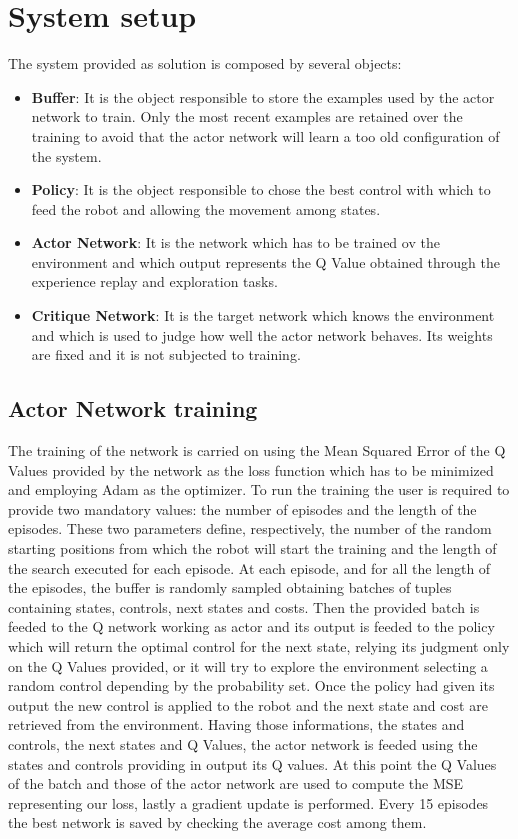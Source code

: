 \documentclass[twocolumn, a4paper]{article}
\begin{document}
\section{System setup}
The system provided as solution is composed by several objects:
\begin{itemize}
	\item \textbf{Buffer}: It is the object responsible to store the examples
		used by the actor network to train. Only the most recent examples are
		retained over the training to avoid that the actor network will learn
		a too old configuration of the system.
	\item \textbf{Policy}: It is the object responsible to chose the best
		control with which to feed the robot and allowing the movement among
		states.
	\item \textbf{Actor Network}: It is the network which has to be trained
		ov the environment and which output represents the Q Value obtained
		through the experience replay and exploration tasks.
	\item \textbf{Critique Network}: It is the target network which knows the
		environment and which is used to judge how well the actor network
		behaves. Its weights are fixed and it is not subjected to training. 
\end{itemize}
\subsection{Actor Network training}
The training of the network is carried on using the Mean Squared Error of the
Q Values provided by the network as the loss function which has to be
minimized and employing Adam as the optimizer.
To run the training the user is required to provide two mandatory values: the
number of episodes and the length of the episodes. These two parameters define,
respectively, the number of the random starting positions from which the 
robot will start the training and the length of the search executed for each
episode.
At each episode, and for all the length of the episodes, the buffer is randomly
sampled obtaining batches of tuples containing states, controls, next states
and costs. Then the provided batch is feeded to the Q network working as actor
and its output is feeded to the policy which will return the optimal control
for the next state, relying its judgment only on the Q Values provided, or it 
will try to explore the environment selecting a random control depending
by the probability set.
Once the policy had given its output the new control is applied to the robot
and the next state and cost are retrieved from the environment.
Having those informations, the states and controls, the next states and Q
Values, the actor network is feeded using the states and controls providing in
output its Q values. At this point the Q Values of the batch and those of the
actor network are used to compute the MSE representing our loss, lastly a
gradient update is performed.
Every 15 episodes the best network is saved by checking the average cost
among them.
\end{document}
